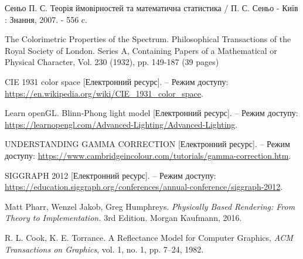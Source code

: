 
 \renewcommand{\bibname}{СПИСОК ВИКОРИСТАНИХ ДЖЕРЕЛ}
 \begin{thebibliography}{}
 \setcounter{theorem}{0}

  Сеньо П. С. Теорія ймовірностей та математична статистика / П. С. Сеньо - Київ : Знання, 2007. - 556 c.

  The Colorimetric Properties of the Spectrum. 
  Philosophical Transactions of the Royal Society of London. Series A, Containing Papers of a Mathematical or Physical Character,
  Vol. 230 (1932), pp. 149-187 (39 pages)

    CIE 1931 color space [Електронний ресурс]. – Режим доступу: \url{https://en.wikipedia.org/wiki/CIE_1931_color_space}.

    Learn openGL. Blinn-Phong light model [Електронний ресурс]. – Режим доступу: \url{https://learnopengl.com/Advanced-Lighting/Advanced-Lighting}.

    UNDERSTANDING GAMMA CORRECTION [Електронний ресурс]. – Режим доступу: \url{https://www.cambridgeincolour.com/tutorials/gamma-correction.htm}.

    SIGGRAPH 2012 [Електронний ресурс]. – Режим доступу: \url{https://education.siggraph.org/conferences/annual-conference/siggraph-2012}.

    Matt Pharr, Wenzel Jakob, Greg Humphreys. \textit{Physically Based Rendering: From Theory to Implementation.} 3rd Edition. Morgan Kaufmann, 2016.

    R. L. Cook, K. E. Torrance. A Reflectance Model for Computer Graphics, \textit{ACM Transactions on Graphics}, vol. 1, no. 1, pp. 7--24, 1982.

 \end {thebibliography}
